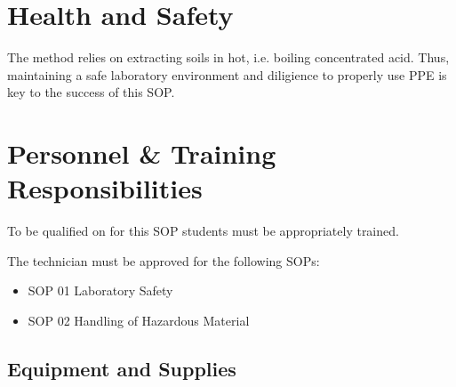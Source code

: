 \documentclass[12pt]{../SOP3_alpha}\usepackage[]{graphicx}\usepackage[]{color}
\begin{document}
\section{Health and Safety}

\NP The method relies on extracting soils in hot, i.e. boiling concentrated acid. Thus, maintaining a safe laboratory environment and diligience to properly use PPE is key to the success of this SOP. 


\section{Personnel \& Training Responsibilities}

\NP To be qualified on for this SOP students must be appropriately trained.

The technician must be approved for the following SOPs:

\begin{itemize}
  \item SOP 01 Laboratory Safety
  \item SOP 02 Handling of Hazardous Material
\end{itemize}


\subsection{Equipment and Supplies}
\end{document}
